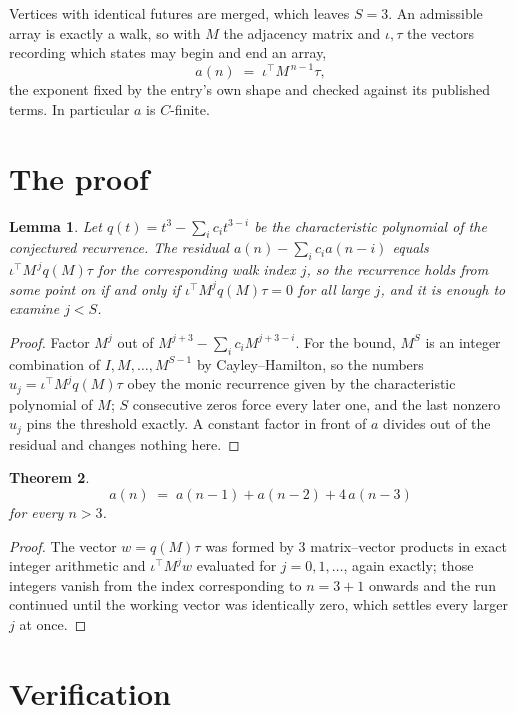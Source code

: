 \documentclass[11pt,a4paper]{article}
\theoremstyle{plain}
\newtheorem{theorem}{Theorem}
\newtheorem{lemma}[theorem]{Lemma}
\theoremstyle{definition}
\begin{document}
Vertices with identical futures are merged, which leaves $S=3$. An admissible array is exactly a walk, so with $M$ the adjacency matrix and $\iota,\tau$ the vectors recording which states may begin and end an array,
\[
a(n)\;=\;\iota^{\!\top}M^{\,n-1}\tau ,
\]
the exponent fixed by the entry's own shape and checked against its published terms. In
particular $a$ is $C$-finite.

\section{The proof}

\begin{lemma}\label{lem:crit}
Let $q(t)=t^{3}-\sum_i c_it^{3-i}$ be the characteristic polynomial of the
conjectured recurrence. The residual $a(n)-\sum_ic_ia(n-i)$ equals
$\iota^{\!\top}M^{\,j}q(M)\tau$ for the corresponding walk index $j$, so the recurrence
holds from some point on if and only if $\iota^{\!\top}M^{j}q(M)\tau=0$ for all large $j$,
and it is enough to examine $j<S$.
\end{lemma}

\begin{proof}
Factor $M^{j}$ out of $M^{j+3}-\sum_ic_iM^{j+3-i}$. For the bound, $M^{S}$
is an integer combination of $I,M,\dots,M^{S-1}$ by Cayley--Hamilton, so the numbers
$u_j=\iota^{\!\top}M^{j}q(M)\tau$ obey the monic recurrence given by the characteristic
polynomial of $M$; $S$ consecutive zeros force every later one, and the last nonzero $u_j$
pins the threshold exactly. A constant factor in front of $a$ divides out of the residual and
changes nothing here.
\end{proof}

\begin{theorem}
\[
a(n)\;=\;a(n-1) + a(n-2) + 4\,a(n-3)
\]
for every $n>3$.
\end{theorem}

\begin{proof}
The vector $w=q(M)\tau$ was formed by $3$ matrix--vector products in exact integer
arithmetic and $\iota^{\!\top}M^{j}w$ evaluated for $j=0,1,\dots$, again exactly; those
integers vanish from the index corresponding to $n=3+1$ onwards and the run continued
until the working vector was identically zero, which settles every larger $j$ at once.
\end{proof}

\section{Verification}
\end{document}
